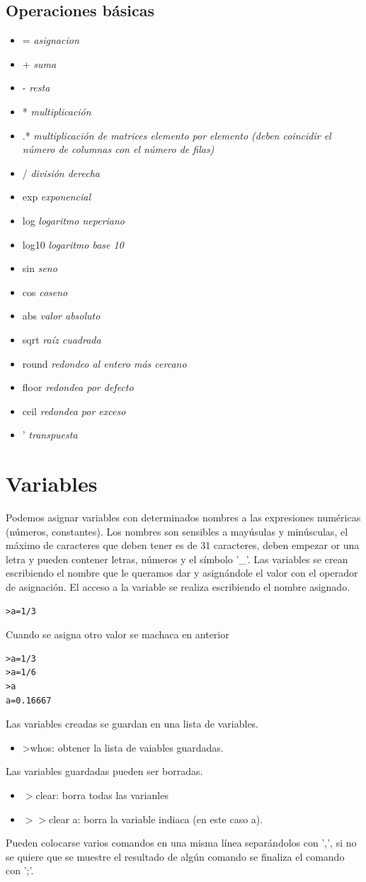 \documentclass[a4,12pt,graphicx,caption,rotating]{article}
\begin{document}
\subsection{Operaciones básicas}
\begin{itemize}
\item= \emph{asignacion}
\item+ \emph{suma}
\item- \emph{resta}
\item* \emph{multiplicación}
\item.* \emph{multiplicación de matrices elemento por elemento (deben coincidir el número de columnas con el número de filas)}
\item/ \emph{división derecha}
\item exp \emph{exponencial}
\item log \emph{logaritmo neperiano}
\item log10 \emph{logaritmo base 10}
\item sin \emph{seno}
\item cos \emph{coseno}
\item abs \emph{valor absoluto}
\item sqrt \emph{raíz cuadrada}
\item round \emph{redondeo al entero más cercano}
\item floor \emph{redondea por defecto}
\item ceil \emph{redondea por exceso}
\item ' \emph{transpuesta}
\end{itemize}
\section{Variables}
Podemos asignar variables con determinados nombres a las expresiones numéricas (números, constantes). Los nombres son sensibles a mayúsulas y minúsculas, el máximo de caracteres que deben tener es de 31 caracteres, deben empezar or una letra y pueden contener letras, números y el símbolo '\_'. Las variables se crean escribiendo el nombre que le queramos dar y asignándole el valor con el operador de asignación. El acceso a la variable se realiza escribiendo el nombre asignado.
\begin{verbatim}
>a=1/3
\end{verbatim}
Cuando se asigna otro valor se machaca en anterior
\begin{verbatim}
>a=1/3
>a=1/6
>a
a=0.16667
\end{verbatim}
Las variables creadas se guardan en una lista de variables.
\begin{itemize}
\item>whos: obtener la lista de vaiables guardadas.
\end{itemize}
Las variables guardadas pueden ser borradas.
\begin{itemize}
\item$>$clear: borra todas las varianles
\item$>>$clear a: borra la variable indiaca (en este caso a).
\end{itemize}
Pueden colocarse varios comandos en una misma línea separándolos con ',', si no se quiere que se muestre el resultado de algún comando se finaliza el comando con ';'.
\end{document}

